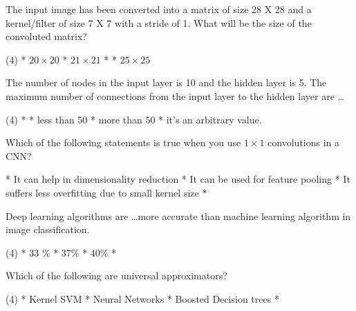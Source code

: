 \documentclass[10pt]{extarticle}
\begin{document}
\begin{exercise}
    The input image has been converted into a matrix of size 28 X 28 and a kernel/filter of size 7 X 7 with a stride of 1. What will be the size of the convoluted matrix?
    \begin{choice} (4)
        * \(20 \times 20\)
        * \(21 \times 21\)
        * 
        * \(25 \times 25\)
    \end{choice}
\end{exercise}
\begin{solution}
\end{solution}

\begin{exercise}
    The number of nodes in the input layer is 10 and the hidden layer is 5. The maximum number of connections from the input layer to the hidden layer are \dots
    \begin{choice} (4)
        * 
        * less than 50
        * more than 50
        * it's an arbitrary value.
    \end{choice}
\end{exercise}
\begin{solution}
\end{solution}

\begin{exercise}
    Which of the following statements is true when you use \(1\times 1\) convolutions in a CNN?
    \begin{choice}
        * It can help in dimensionality reduction
        * It can be used for feature pooling
        * It suffers less overfitting due to small kernel size
        * 
    \end{choice}
\end{exercise}
\begin{solution}
\end{solution}

\begin{exercise}
    Deep learning algorithms are \dots more accurate than machine learning algorithm in image classification.
    \begin{choice} (4)
        * 33 \%
        * 37\%
        * 40\%
        * 
    \end{choice}
\end{exercise}
\begin{solution}
\end{solution}

\begin{exercise}
    Which of the following are universal approximators?
    \begin{choice} (4)
        * Kernel SVM
        * Neural Networks
        * Boosted Decision trees
        * 
    \end{choice}
\end{exercise}
\begin{solution}
\end{solution}
\end{document}
